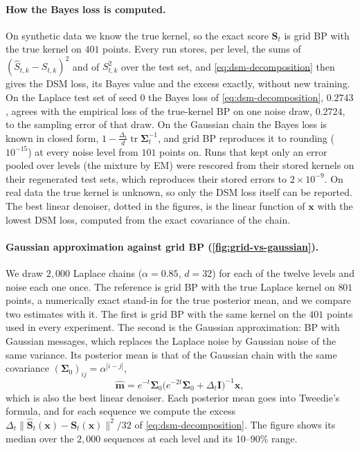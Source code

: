 \documentclass{article}
\begin{document}
\paragraph{How the Bayes loss is computed.} On synthetic data we know the true kernel, so the exact score $\mathbf S_t$ is
grid BP with the true kernel on $401$ points. Every run stores, per level, the sums of
$(\widehat S_{t,k}-S_{t,k})^2$ and of $S_{t,k}^2$ over the test set, and \cref{eq:dsm-decomposition} then gives the DSM
loss, its Bayes value and the excess exactly, without new training. On the Laplace test set of seed 0 the Bayes loss of
\cref{eq:dsm-decomposition}, $0.2743$, agrees with the empirical loss of the true-kernel BP on one noise draw, $0.2724$,
to the sampling error of that draw. On the Gaussian chain the Bayes loss is known in closed form, $1-\frac{\Delta_t}{d}\operatorname{tr}\boldsymbol\Sigma_t^{-1}$,
and grid BP reproduces it to rounding ($10^{-15}$) at every noise level from $101$ points on. Runs that kept only an error pooled over levels (the mixture by EM) were rescored
from their stored kernels on their regenerated test sets, which reproduces their stored errors to $2\times10^{-9}$. On real
data the true kernel is unknown, so only the DSM loss itself can be reported. The best linear denoiser, dotted in the
figures, is the linear function of $\mathbf x$ with the lowest DSM loss, computed from the exact covariance of the chain.

\paragraph{Gaussian approximation against grid BP (\cref{fig:grid-vs-gaussian}).} We draw $2{,}000$ Laplace chains
($\alpha=0.85$, $d=32$) for each of the twelve levels and noise each one once. The reference is grid BP with the true
Laplace kernel on $801$ points, a numerically exact stand-in for the true posterior mean, and we compare two estimates
with it. The first is grid BP with the same kernel on the $401$ points used in every experiment. The second is the
Gaussian approximation: BP with Gaussian messages, which replaces the Laplace noise by Gaussian noise of the same
variance. Its posterior mean is that of the Gaussian chain with the same covariance $(\boldsymbol\Sigma_0)_{ij}=
\alpha^{|i-j|}$,
\begin{equation}
  \widehat{\mathbf m}=e^{-t}\boldsymbol\Sigma_0\big(e^{-2t}\boldsymbol\Sigma_0+\Delta_t\mathbf I\big)^{-1}\mathbf x,
\end{equation}
which is also the best linear denoiser. Each posterior mean goes into Tweedie's formula, and for each sequence we compute
the excess $\Delta_t\|\widehat{\mathbf S}_t(\mathbf x)-\mathbf S_t(\mathbf x)\|^2/32$ of \cref{eq:dsm-decomposition}. The
figure shows its median over the $2{,}000$ sequences at each level and its 10--90\% range.
\end{document}
